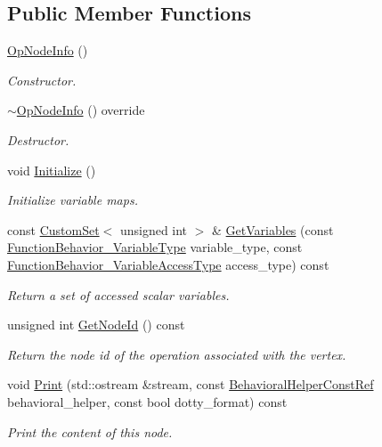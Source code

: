 \subsection*{Public Member Functions}
\begin{DoxyCompactItemize}
\item 
\hyperlink{structOpNodeInfo_a756bde8314600d48ef576baea924d165}{Op\+Node\+Info} ()
\begin{DoxyCompactList}\small\item\em Constructor. \end{DoxyCompactList}\item 
\hyperlink{structOpNodeInfo_ab13421a387f9fe59dd73a080d0cdb8de}{$\sim$\+Op\+Node\+Info} () override
\begin{DoxyCompactList}\small\item\em Destructor. \end{DoxyCompactList}\item 
void \hyperlink{structOpNodeInfo_a0ce82bb59facad4a65403621b9fe88c6}{Initialize} ()
\begin{DoxyCompactList}\small\item\em Initialize variable maps. \end{DoxyCompactList}\item 
const \hyperlink{custom__set_8hpp_a615bc2f42fc38a4bb1790d12c759e86f}{Custom\+Set}$<$ unsigned int $>$ \& \hyperlink{structOpNodeInfo_aea18a24d98562fb66b276ac3240e294e}{Get\+Variables} (const \hyperlink{function__behavior_8hpp_aff0ab7827d49a7aca1f277e0ff126755}{Function\+Behavior\+\_\+\+Variable\+Type} variable\+\_\+type, const \hyperlink{function__behavior_8hpp_a68c28bfcfefbe63cece191e941af0409}{Function\+Behavior\+\_\+\+Variable\+Access\+Type} access\+\_\+type) const
\begin{DoxyCompactList}\small\item\em Return a set of accessed scalar variables. \end{DoxyCompactList}\item 
unsigned int \hyperlink{structOpNodeInfo_a5eb05c908fcd5a42b4ea921f21ac6393}{Get\+Node\+Id} () const
\begin{DoxyCompactList}\small\item\em Return the node id of the operation associated with the vertex. \end{DoxyCompactList}\item 
void \hyperlink{structOpNodeInfo_a8b9d0224e6ca9d88447fe8d7a7c093d8}{Print} (std\+::ostream \&stream, const \hyperlink{behavioral__helper_8hpp_aae973b54cac87eef3b27442aa3e1e425}{Behavioral\+Helper\+Const\+Ref} behavioral\+\_\+helper, const bool dotty\+\_\+format) const
\begin{DoxyCompactList}\small\item\em Print the content of this node. \end{DoxyCompactList}\end{DoxyCompactItemize}
